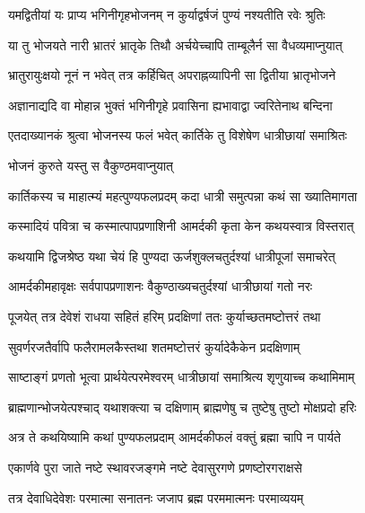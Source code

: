 \twolineshloka
{यमद्वितीयां यः प्राप्य भगिनीगृहभोजनम्}
{न कुर्याद्वर्षजं पुण्यं नश्यतीति रवेः श्रुतिः} %

\twolineshloka
{या तु भोजयते नारी भ्रातरं भ्रातृके तिथौ}
{अर्चयेच्चापि ताम्बूलैर्न सा वैधव्यमाप्नुयात्} %

\twolineshloka
{भ्रातुरायुःक्षयो नूनं न भवेत् तत्र कर्हिचित्}
{अपराह्नव्यापिनी सा द्वितीया भ्रातृभोजने} %

\twolineshloka
{अज्ञानाद्यदि वा मोहान्न भुक्तं भगिनीगृहे}
{प्रवासिना ह्यभावाद्वा ज्वरितेनाथ बन्दिना} %

\twolineshloka
{एतदाख्यानकं श्रुत्वा भोजनस्य फलं भवेत्}
{कार्तिके तु विशेषेण धात्रीछायां समाश्रितः} %


\onelineshloka
{भोजनं कुरुते यस्तु स वैकुण्ठमवाप्नुयात्} %





\twolineshloka
{कार्तिकस्य च माहात्म्यं महत्पुण्यफलप्रदम्}
{कदा धात्री समुत्पन्ना कथं सा ख्यातिमागता} %

\twolineshloka
{कस्मादियं पवित्रा च कस्मात्पापप्रणाशिनी}
{आमर्दकी कृता केन कथयस्वात्र विस्तरात्} %


\twolineshloka
{कथयामि द्विजश्रेष्ठ यथा चेयं हि पुण्यदा}
{ऊर्जशुक्लचतुर्दश्यां धात्रीपूजां समाचरेत्} %

\twolineshloka
{आमर्दकीमहावृक्षः सर्वपापप्रणाशनः}
{वैकुण्ठाख्यचतुर्दश्यां धात्रीछायां गतो नरः} %

\twolineshloka
{पूजयेत् तत्र देवेशं राधया सहितं हरिम्}
{प्रदक्षिणां ततः कुर्याच्छतमष्टोत्तरं तथा} %

\twolineshloka
{सुवर्णरजतैर्वापि फलैरामलकैस्तथा}
{शतमष्टोत्तरं कुर्यादेकैकेन प्रदक्षिणाम्} %

\twolineshloka
{साष्टाङ्गं प्रणतो भूत्वा प्रार्थयेत्परमेश्वरम्}
{धात्रीछायां समाश्रित्य शृणुयाच्च कथामिमाम्} %

\twolineshloka
{ब्राह्मणान्भोजयेत्पश्चाद् यथाशक्त्या च दक्षिणाम्}
{ब्राह्मणेषु च तुष्टेषु तुष्टो मोक्षप्रदो हरिः} %

\twolineshloka
{अत्र ते कथयिष्यामि कथां पुण्यफलप्रदाम्}
{आमर्दकीफलं वक्तुं ब्रह्मा चापि न पार्यते} %


\twolineshloka
{एकार्णवे पुरा जाते नष्टे स्थावरजङ्गमे}
{नष्टे देवासुरगणे प्रणष्टोरगराक्षसे} %

\twolineshloka
{तत्र देवाधिदेवेशः परमात्मा सनातनः}
{जजाप ब्रह्म परममात्मनः परमाव्ययम्} %

